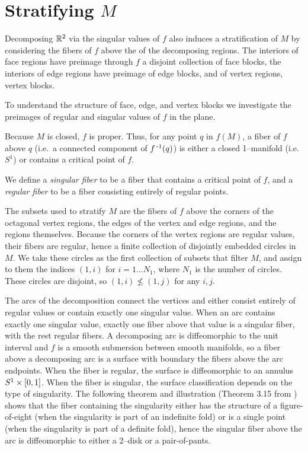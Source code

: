 \section{Stratifying $M$}

Decomposing $\mathbb{R}^2$ via the singular values of $f$ also induces a stratification of $M$
by considering the fibers of $f$ above the of the decomposing regions.
The interiors of face regions have preimage through $f$ a disjoint collection of face blocks, the interiors of edge regions have preimage of edge blocks, and of vertex regions, vertex blocks.

To understand the structure of face, edge, and vertex blocks we investigate the preimages of regular and singular values of $f$ in the plane.
\begin{defn}
	Because $M$ is closed, $f$ is proper.
	Thus, for any point $q$ in $f(M)$, a fiber of $f$ above $q$ (i.e.\ a connected component of $f^{\,\text{-}1}(q)$) is either a closed 1--manifold (i.e.\ $S^1$) or contains a critical point of $f$.
	
	We define a \emph{singular fiber} to be a fiber that contains a critical point of $f$, and a \emph{regular fiber} to be a fiber consisting entirely of regular points.	
\end{defn}

The subsets used to stratify $M$ are the fibers of $f$ above the corners of the octagonal vertex regions, the edges of the vertex and edge regions, and the regions themselves.
Because the corners of the vertex regions are regular values, their fibers are regular, hence a finite collection of disjointly embedded circles in $M$.
We take these circles as the first collection of subsets that filter $M$, and assign to them the indices $(1,i)$ for $i = 1\dots N_1$, where $N_1$ is the number of circles.
These circles are disjoint, so $(1,i)\nleq (1,j)$ for any $i,j$.

The arcs of the decomposition connect the vertices and either consist entirely of regular values or contain exactly one singular value.
When an arc contains exactly one singular value, exactly one fiber above that value is a singular fiber, with the rest regular fibers.
A decomposing arc is diffeomorphic to the unit interval and $f$ is a smooth submersion between smooth manifolds, so a fiber above a decomposing arc is a surface with boundary the fibers above the arc endpoints.
When the fiber is regular, the surface is diffeomorphic to an annulus $S^1\times[0,1]$.
When the fiber is singular, the surface classification depends on the type of singularity.
The following theorem and illustration (Theorem 3.15 from \cite{Saeki}) shows that the fiber containing the singularity either has the structure of a figure-of-eight (when the singularity is part of an indefinite fold) or is a single point (when the singularity is part of a definite fold), hence the singular fiber above the arc is diffeomorphic to either a 2--disk or a pair-of-pants.

